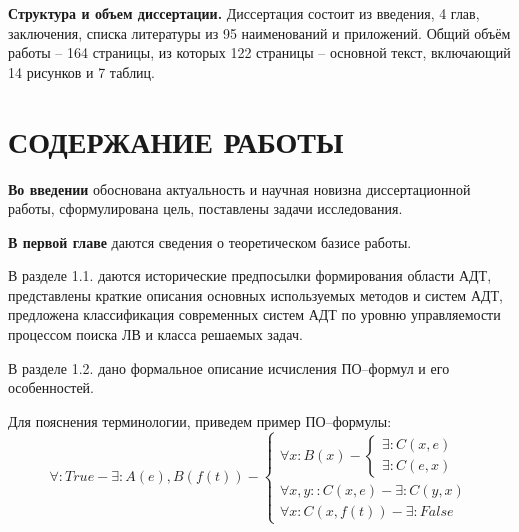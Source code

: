 \documentclass[a4paper]{report}
\begin{document}

\textbf{Структура и объем диссертации.} Диссертация состоит из введения, 4 глав, заключения, списка литературы из 95 наименований и приложений. Общий объём работы -- 164 страницы, из которых 122 страницы -- основной текст, включающий 14 рисунков и 7 таблиц.


\section*{СОДЕРЖАНИЕ РАБОТЫ}


\textbf{Во введении} обоснована актуальность и научная новизна диссертационной работы, сформулирована цель, поставлены задачи исследования.


\textbf{В первой главе} даются сведения о теоретическом базисе работы.

В разделе 1.1. даются исторические предпосылки формирования области АДТ, представлены краткие описания основных используемых методов и систем АДТ, предложена классификация современных систем АДТ по уровню управляемости процессом поиска ЛВ и класса решаемых задач.%

В разделе 1.2. дано формальное описание исчисления ПО--формул и его особенностей.

Для пояснения терминологии, приведем пример ПО--формулы:
$$
\forall\colon True - \exists\colon A(e),B(f(t)) - \left\{
\begin{array}{lcl}
 \forall x \colon B(x) - \left\{
     \begin{array}{lcl}
     \exists \colon C(x,e) \\
     \exists \colon C(e,x)
    \end{array}\right. \\
 \forall x,y \colon \colon C(x,e) - \exists\colon C(y,x) \\
 \forall x \colon C(x,f(t)) - \exists\colon False
\end{array}
\right.
$$
\end{document}
